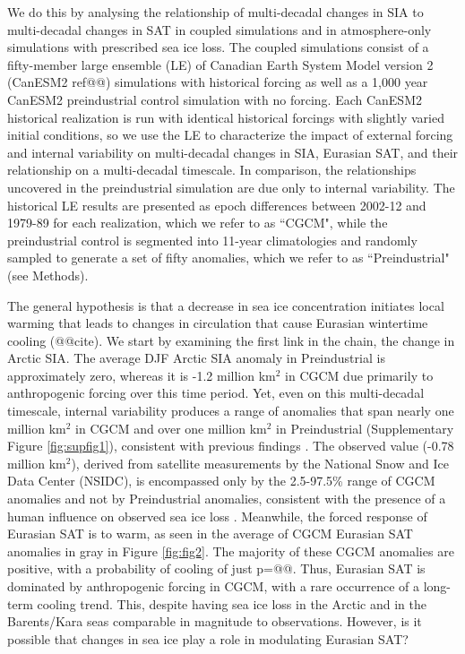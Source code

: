 \documentclass{nature}
\begin{document}
We do this by analysing the relationship of multi-decadal changes in SIA to multi-decadal changes in SAT in coupled simulations and in atmosphere-only simulations with prescribed sea ice loss. The coupled simulations consist of a fifty-member large ensemble (LE) of Canadian Earth System Model version 2 (CanESM2 ref@@) simulations with historical forcing as well as a 1,000 year CanESM2 preindustrial control simulation with no forcing. Each CanESM2 historical realization is run with identical historical forcings with slightly varied initial conditions, so we use the LE to characterize the impact of external forcing and internal variability on multi-decadal changes in SIA, Eurasian SAT, and their relationship on a multi-decadal timescale. In comparison, the relationships uncovered in the preindustrial simulation are due only to internal variability. The historical LE results are presented as epoch differences between 2002-12 and 1979-89 for each realization, which we refer to as ``CGCM", while the preindustrial control is segmented into 11-year climatologies and randomly sampled to generate a set of fifty anomalies, which we refer to as ``Preindustrial" (see Methods). 

The general hypothesis is that a decrease in sea ice concentration initiates local warming that leads to changes in circulation that cause Eurasian wintertime cooling (@@cite). We start by examining the first link in the chain, the change in Arctic SIA. The average DJF Arctic SIA anomaly in Preindustrial is approximately zero, whereas it is -1.2 million km$^2$ in CGCM due primarily to anthropogenic forcing over this time period. Yet, even on this multi-decadal timescale, internal variability produces a range of anomalies that span nearly one million km$^2$ in CGCM and over one million km$^2$ in Preindustrial (Supplementary Figure \ref{fig:supfig1}), consistent with previous findings \cite{swart15}. The observed value (-0.78 million km$^2$), derived from satellite measurements by the National Snow and Ice Data Center (NSIDC), is encompassed only by the 2.5-97.5\% range of CGCM anomalies and not by Preindustrial anomalies, consistent with the presence of a human influence on observed sea ice loss \cite{min08}. Meanwhile, the forced response of Eurasian SAT is to warm, as seen in the average of CGCM Eurasian SAT anomalies in gray in Figure \ref{fig:fig2}. The majority of these CGCM anomalies are positive, with a probability of cooling of just p=@@. Thus, Eurasian SAT is dominated by anthropogenic forcing in CGCM, with a rare occurrence of a long-term cooling trend. This, despite having sea ice loss in the Arctic and in the Barents/Kara seas comparable in magnitude to observations. However, is it possible that changes in sea ice play a role in modulating Eurasian SAT?
\end{document}
